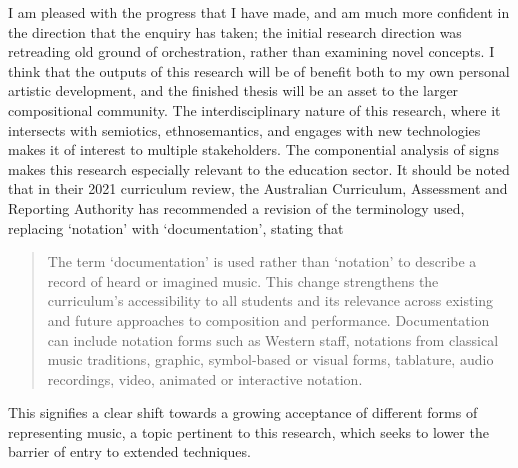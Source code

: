I am pleased with the progress that I have made, and am much more confident in the direction that the enquiry has taken; the initial research direction was retreading old ground of orchestration, rather than examining novel concepts.
I think that the outputs of this research will be of benefit both to my own personal artistic development, and the finished thesis will be an asset to the larger compositional community.
The interdisciplinary nature of this research, where it intersects with semiotics, ethnosemantics, and engages with new technologies makes it of interest to multiple stakeholders.
The componential analysis of signs makes this research especially relevant to the education sector.
It should be noted that in their 2021 curriculum review, the Australian Curriculum, Assessment and Reporting Authority has recommended a revision of the terminology used, replacing `notation' with `documentation', stating that \begin{quotation}
    The term ‘documentation’ is used rather than ‘notation’ to describe a record of heard or imagined music. 
    This change strengthens the curriculum’s accessibility to all students and its relevance across existing and future approaches to composition and performance. 
    Documentation can include notation forms such as Western staff, notations from classical music traditions, graphic, symbol-based or visual forms, tablature, audio recordings, video, animated or interactive notation.\autocite[6]{WhatHasChanged2021}
\end{quotation}
This signifies a clear shift towards a growing acceptance of different forms of representing music, a topic pertinent to this research, which seeks to lower the barrier of entry to extended techniques.